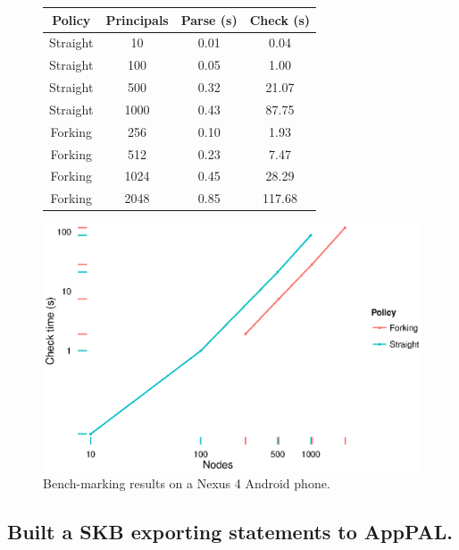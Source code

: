 \documentclass[a4paper]{scrartcl}
\begin{document}
\begin{figure}
  \begin{minipage}{0.49\linewidth}
    \footnotesize
    \begin{tabular}{cccc}
       \toprule
       Policy   & Principals & Parse (s) & Check (s) \\
       \midrule
       Straight & 10    & 0.01      & 0.04      \\
       Straight & 100   & 0.05      & 1.00      \\
       Straight & 500   & 0.32      & 21.07     \\
       Straight & 1000  & 0.43      & 87.75     \\
       \midrule
       Forking  & 256   & 0.10      & 1.93      \\
       Forking  & 512   & 0.23      & 7.47      \\
       Forking  & 1024  & 0.45      & 28.29     \\
       Forking  & 2048  & 0.85      & 117.68    \\
       \bottomrule
    \end{tabular}
  \end{minipage}
  \begin{minipage}{0.49\linewidth}
    \includegraphics[width=\linewidth]{./images/benchmarks.eps}
  \end{minipage}
  \caption{Bench-marking results on a Nexus 4 Android phone.}
  \label{fig:benchmarks}
\end{figure}

\subsection{Built a \ac{SKB} exporting statements to AppPAL.}
\end{document}
